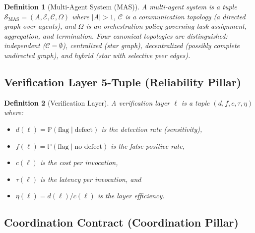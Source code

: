 \documentclass[11pt, a4paper, logo, copyright]{googledeepmind}
\newcommand{\Prob}{\mathbb{P}}
\newtheorem{definition}{Definition}[section]
\begin{document}
\begin{appendices}
\begin{definition}[Multi-Agent System (MAS)]
\label{def:ext-mas}
A \emph{multi-agent system} is a tuple
$\mathcal{S}_{\text{MAS}} = (A, \mathcal{E}, \mathcal{C}, \Omega)$
where $|A| > 1$, $\mathcal{C}$ is a communication topology
(a directed graph over agents), and $\Omega$ is an orchestration policy
governing task assignment, aggregation, and termination.
Four canonical topologies are distinguished:
\emph{independent} ($\mathcal{C} = \emptyset$),
\emph{centralized} (star graph),
\emph{decentralized} (possibly complete undirected graph), and
\emph{hybrid} (star with selective peer edges).
\end{definition}


\subsection{Verification Layer 5-Tuple (Reliability Pillar)}

\begin{definition}[Verification Layer]
\label{def:ext-vlayer}
A \emph{verification layer} $\ell$ is a tuple $(d, f, c, \tau, \eta)$ where:
\begin{itemize}[nosep]
  \item $d(\ell) = \Prob(\text{flag} \mid \text{defect})$ is the detection rate (sensitivity),
  \item $f(\ell) = \Prob(\text{flag} \mid \text{no defect})$ is the false positive rate,
  \item $c(\ell)$ is the cost per invocation,
  \item $\tau(\ell)$ is the latency per invocation, and
  \item $\eta(\ell) = d(\ell) / c(\ell)$ is the layer efficiency.
\end{itemize}
\end{definition}


\subsection{Coordination Contract (Coordination Pillar)}


\end{appendices}
\end{document}
